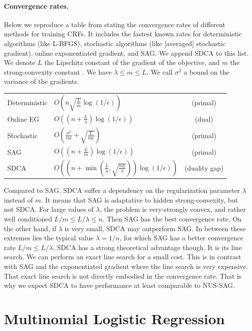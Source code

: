 \documentclass{article}
\DeclareMathOperator{\1}{\mathbb{1}}
\begin{document}
\paragraph{Convergence rates.}
Below we reproduce a table from \cite{schmidt_non-uniform_2015} stating the convergence rates of different methods for training CRFs.
It includes the fastest known rates for deterministic algorithms (like L-BFGS), stochastic algorithms (like [averaged] stochastic gradient), online exponentiated gradient, and SAG.
We append SDCA to this list.
We denote $L$ the Lipschitz constant of the gradient of the objective, and $m$ the strong-convexity constant .
We have $\lambda \leq m \leq L$.
We call $\sigma^2$ a bound on the variance of the gradients.\\
\begin{center}
\begin{tabular}{llc}
Deterministic & $O(n\sqrt{\frac{L}{m}}\log(1/\epsilon))$ & (primal)\\
Online EG & $O((n + \frac{L}{\lambda})\log(1/\epsilon))$ & (dual)\\
Stochastic & $O(\frac{\sigma^2}{m \epsilon}+\sqrt{\frac{L}{m \epsilon}})$ & (primal)\\
SAG & $O((n + \frac{L}{m})\log(1/\epsilon))$ & (primal) \\
SDCA & $O( (n + \min( \frac{L}{\lambda}, \sqrt{\frac{n L}{\lambda}}) ) \log(1/\epsilon) )$ & (duality gap)
\end{tabular}
\end{center}
Compared to SAG, SDCA suffer a dependency on the regularization parameter $\lambda$ instead of $m$.
It means that SAG is adaptative to  hidden strong-convexity, but not SDCA.
For large values of $\lambda$, the problem is very-strongly convex, and rather well  conditioned $L/m \leq L/\lambda \leq n$.
Then SAG has the best convergence rate.
On the other hand, if $\lambda$ is very small, SDCA may outperform SAG.
In between these extremes lies the typical value $\lambda=1/n$, for which SAG has a better convergence rate $L/m \leq L/\lambda $.
SDCA has a strong theoretical advantage though.
It is its line search.
We can perform an exact line search for a small cost.
This is in contrast with SAG and the exponentiated gradient where the line search is very expensive.
That exact line search is not directly embodied in the convergence rate.
That is why we expect SDCA to have performance at least comparable to NUS-SAG.
 

\section{Multinomial Logistic Regression}
\end{document}
